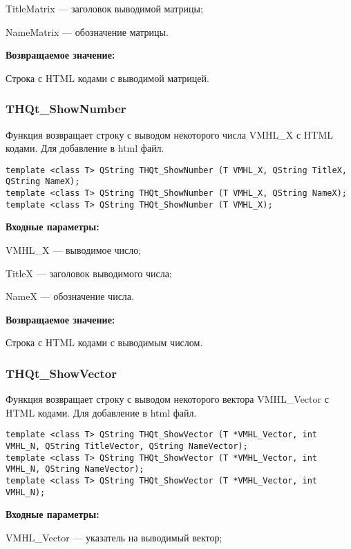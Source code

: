 \documentclass[a4paper,12pt]{article}
\begin{document}
    TitleMatrix --- заголовок выводимой матрицы;
 
    NameMatrix --- обозначение матрицы.

\textbf{Возвращаемое значение:}

Строка с HTML кодами с выводимой матрицей.


\subsubsection{THQt\_ShowNumber}\label{THQt_ShowNumber}

Функция возвращает строку с выводом некоторого числа VMHL\_X с HTML кодами. Для добавление в html файл.


\begin{lstlisting}[label=code_syntax_THQt_ShowNumber,caption=Синтаксис]
template <class T> QString THQt_ShowNumber (T VMHL_X, QString TitleX, QString NameX);
template <class T> QString THQt_ShowNumber (T VMHL_X, QString NameX);
template <class T> QString THQt_ShowNumber (T VMHL_X);
\end{lstlisting}

\textbf{Входные параметры:}

VMHL\_X --- выводимое число;
 
    TitleX --- заголовок выводимого числа;
 
    NameX --- обозначение числа.

\textbf{Возвращаемое значение:}

Строка с HTML кодами с выводимым числом.


\subsubsection{THQt\_ShowVector}\label{THQt_ShowVector}

Функция возвращает строку с выводом некоторого вектора VMHL\_Vector с HTML кодами. Для добавление в html файл.


\begin{lstlisting}[label=code_syntax_THQt_ShowVector,caption=Синтаксис]
template <class T> QString THQt_ShowVector (T *VMHL_Vector, int VMHL_N, QString TitleVector, QString NameVector);
template <class T> QString THQt_ShowVector (T *VMHL_Vector, int VMHL_N, QString NameVector);
template <class T> QString THQt_ShowVector (T *VMHL_Vector, int VMHL_N);
\end{lstlisting}

\textbf{Входные параметры:}

VMHL\_Vector --- указатель на выводимый вектор;
 
\end{document}
